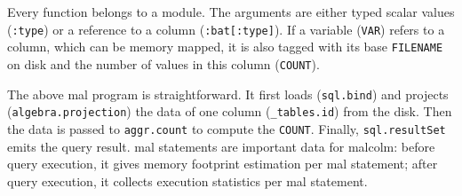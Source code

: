 \documentclass[conference]{IEEEtran}
\begin{document}
Every function belongs to a module.
The arguments are either typed scalar values (\texttt{\small :type}) or a reference to a column (\texttt{\small :bat[:type]}).
If a variable (\texttt{\small VAR}) refers to a column, which can be memory mapped, it is also tagged with its base \texttt{\small FILENAME} on disk and the number of values in this column (\texttt{\small COUNT}).

The above {\sc mal} program is straightforward.
It first loads (\texttt{\small sql.bind}) and projects (\texttt{\small algebra.projection}) the data of one column (\texttt{\small \_tables.id}) from the disk.
Then the data is passed to \texttt{\small aggr.count} to compute the \texttt{\small COUNT}.
Finally, \texttt{\small sql.resultSet} emits the query result.
{\sc mal} statements are important data for {\sc malcolm}: before query execution, it gives memory footprint estimation per {\sc mal} statement; after query execution, it collects execution statistics per {\sc mal} statement.
\end{document}
